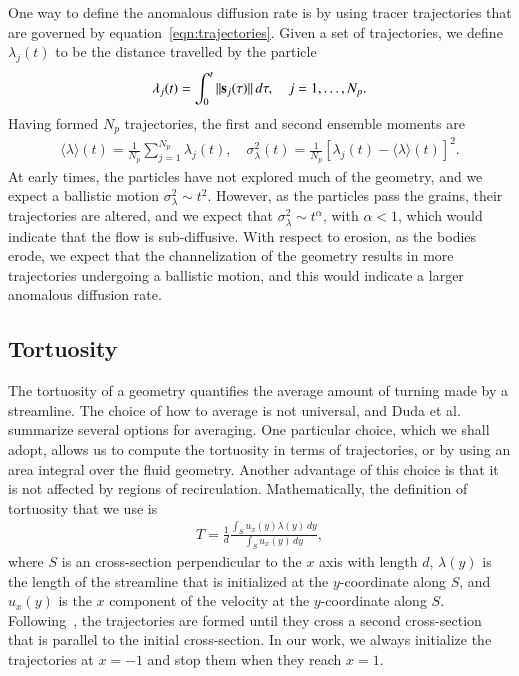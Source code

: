 \documentclass[preprint, 10pt]{elsarticle}
\begin{document}
One way to define the anomalous diffusion rate is by using tracer
trajectories that are governed by equation~\eqref{eqn:trajectories}.
Given a set of trajectories, we define $\lambda_j(t)$ to be the distance
travelled by the particle
\begin{align}
  \lambda_j(t) = \int_{0}^t \|\ss_j(\tau)\|\, d\tau, 
    \quad j=1,\ldots,N_p.
\end{align}
Having formed $N_p$ trajectories, the first and second ensemble moments
are
\begin{align}
  \langle \lambda \rangle (t) = 
    \frac{1}{N_p} \sum_{j=1}^{N_p} \lambda_j(t), \quad 
    \sigma_\lambda^2(t) = \frac{1}{N_p} 
    \left[\lambda_j(t) - \langle \lambda \rangle(t) \right]^2.
\end{align}
At early times, the particles have not explored much of the geometry,
and we expect a ballistic motion $\sigma_\lambda^2 \sim t^2$.  However,
as the particles pass the grains, their trajectories are altered, and we
expect that $\sigma_\lambda^2 \sim t^\alpha$, with $\alpha < 1$, which
would indicate that the flow is sub-diffusive.  With respect to erosion,
as the bodies erode, we expect that the channelization of the geometry
results in more trajectories undergoing a ballistic motion, and this
would indicate a larger anomalous diffusion rate.

\subsection{Tortuosity}
The tortuosity of a geometry quantifies the average amount of turning
made by a streamline.  The choice of how to average is not universal,
and Duda et al.~\cite{dud-koz-mat2011} summarize several options for
averaging.  One particular choice, which we shall adopt, allows us to
compute the tortuosity in terms of trajectories, or by using an area
integral over the fluid geometry.  Another advantage of this choice is
that it is not affected by regions of recirculation.  Mathematically,
the definition of tortuosity that we use is
\begin{align}
  T = \frac{1}{d}\frac{\displaystyle\int_{S}u_x(y)\lambda(y)\,dy}
  {\displaystyle\int_{S}u_x(y)\,dy},
  \label{eqn:tortuosity1}
\end{align}
where $S$ is an cross-section perpendicular to the $x$ axis with length
$d$, $\lambda(y)$ is the length of the streamline that is initialized
at the $y$-coordinate along $S$, and $u_x(y)$ is the $x$ component of
the velocity at the $y$-coordinate along $S$.
Following~\cite{dud-koz-mat2011}, the trajectories are formed until they
cross a second cross-section that is parallel to the initial
cross-section.  In our work, we always initialize the trajectories at
$x=-1$ and stop them when they reach $x=1$.
\end{document}
